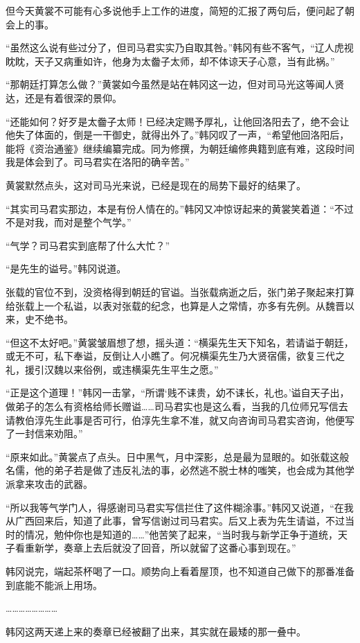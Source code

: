 但今天黄裳不可能有心多说他手上工作的进度，简短的汇报了两句后，便问起了朝会上的事。

“虽然这么说有些过分了，但司马君实实乃自取其咎。”韩冈有些不客气，“辽人虎视眈眈，天子又病重如许，他身为太齤子太师，却不体谅天子心意，当有此祸。”

“那朝廷打算怎么做？”黄裳如今虽然是站在韩冈这一边，但对司马光这等闻人贤达，还是有着很深的景仰。

“还能如何？好歹是太齤子太师！已经决定赐予厚礼，让他回洛阳去了，绝不会让他失了体面的，倒是一干御史，就得出外了。”韩冈叹了一声，“希望他回洛阳后，能将《资治通鉴》继续编纂完成。同为修撰，为朝廷编修典籍到底有难，这段时间我是体会到了。司马君实在洛阳的确辛苦。”

黄裳默然点头，这对司马光来说，已经是现在的局势下最好的结果了。

“其实司马君实那边，本是有份人情在的。”韩冈又冲惊讶起来的黄裳笑着道：“不过不是对我，而对是整个气学。”

“气学？司马君实到底帮了什么大忙？”

“是先生的谥号。”韩冈说道。

张载的官位不到，没资格得到朝廷的官谥。当张载病逝之后，张门弟子聚起来打算给张载上一个私谥，以表对张载的纪念，也算是人之常情，亦多有先例。从魏晋以来，史不绝书。

“但这不太好吧。”黄裳皱眉想了想，摇头道：“横渠先生天下知名，若请谥于朝廷，或无不可，私下奉谥，反倒让人小瞧了。何况横渠先生乃大贤宿儒，欲复三代之礼，援引汉魏以来俗例，或违横渠先生平生之愿。”

“正是这个道理！”韩冈一击掌，“所谓‘贱不诔贵，幼不诔长，礼也。’谥自天子出，做弟子的怎么有资格给师长赠谥……司马君实也是这么看，当我的几位师兄写信去请教伯淳先生此事是否可行，伯淳先生拿不准，就又向咨询司马君实咨询，他便写了一封信来劝阻。”

“原来如此。”黄裳点了点头。日中黑气，月中深影，总是最为显眼的。如张载这般名儒，他的弟子若是做了违反礼法的事，必然逃不脱士林的嗤笑，也会成为其他学派拿来攻击的武器。

“所以我等气学门人，得感谢司马君实写信拦住了这件糊涂事。”韩冈又说道，“在我从广西回来后，知道了此事，曾写信谢过司马君实。后又上表为先生请谥，不过当时的情况，勉仲你也是知道的……”他苦笑了起来，“当时我与新学正争于道统，天子看重新学，奏章上去后就没了回音，所以就留了这番心事到现在。”

韩冈说完，端起茶杯喝了一口。顺势向上看着屋顶，也不知道自己做下的那番准备到底能不能派上用场。

……………………

韩冈这两天递上来的奏章已经被翻了出来，其实就在最矮的那一叠中。

